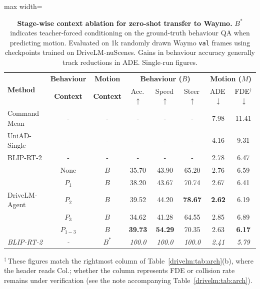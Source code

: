 \begin{table}[t]
  \centering
  \caption[Stage-wise ablation on zero-shot generalisation to Waymo]{\textbf{Stage-wise context ablation for zero-shot transfer to Waymo.} $B^{*}$ indicates teacher-forced conditioning on the ground-truth behaviour QA when predicting motion. Evaluated on 1k randomly drawn Waymo \texttt{val} frames using checkpoints trained on DriveLM-nuScenes. Gains in behaviour accuracy generally track reductions in ADE. Single-run figures.}
  \label{drivelm:tab:waymo_supp}
  \begin{adjustbox}{max width=\textwidth}
  \begin{tabular}{l|cc|ccc|cc}
    \toprule
    \multirow{2}{*}{\textbf{Method}} & \textbf{Behaviour} & \textbf{Motion} & \multicolumn{3}{c|}{\textbf{Behaviour ($B$)}} & \multicolumn{2}{c}{\textbf{Motion ($M$)}} \\
    & \textbf{Context} & \textbf{Context} & Acc.\,$\uparrow$ & Speed\,$\uparrow$ & Steer\,$\uparrow$ & ADE\,$\downarrow$ & FDE$^{\dagger}$\,$\downarrow$ \\
    \midrule
    Command Mean & - & - & - & - & - & 7.98 & 11.41 \\
    UniAD-Single & - & - & - & - & - & 4.16 & 9.31 \\
    BLIP-RT-2 & - & - & - & - & - & 2.78 & 6.47 \\
    \midrule
    & None & $B$ & 35.70 & 43.90 & 65.20 & 2.76 & 6.59 \\
    & $P_1$ & $B$ & 38.20 & 43.67 & 70.74 & 2.67 & 6.41 \\
    DriveLM-Agent & $P_2$ & $B$ & 39.52 & 44.20 & \textbf{78.67} & \textbf{2.62} & 6.19 \\
    & $P_3$ & $B$ & 34.62 & 41.28 & 64.55 & 2.85 & 6.89 \\
    & $P_{1-3}$ & $B$ & \textbf{39.73} & \textbf{54.29} & 70.35 & 2.63 & \textbf{6.17} \\
    \midrule
    \textit{BLIP-RT-2} & \textit{-} & $B^{*}$ & \textit{100.0} & \textit{100.0} & \textit{100.0} & \textit{2.41} & \textit{5.79} \\
    \bottomrule
  \end{tabular}
  \end{adjustbox}
  \par\smallskip
  {\linespread{1.1}\footnotesize\raggedright
  $^{\dagger}$\,These figures match the rightmost column of Table~\ref{drivelm:tab:arch}(b), where the header reads Col.; whether the column represents FDE or collision rate remains under verification (see the note accompanying Table~\ref{drivelm:tab:arch}).\par}
\end{table}

